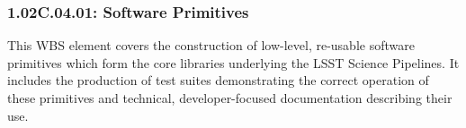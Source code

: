 \subsubsection{1.02C.04.01: Software Primitives}

This WBS element covers the construction of low-level, re-usable software
primitives which form the core libraries underlying the LSST Science
Pipelines. It includes the production of test suites demonstrating the correct
operation of these primitives and technical, developer-focused documentation
describing their use.
